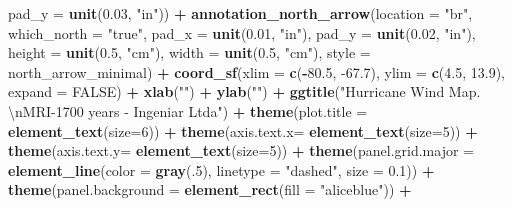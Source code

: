 \documentclass[12pt,oneside]{reedthesis}
\newenvironment{Shaded}{\begin{snugshade}}{\end{snugshade}}
\newcommand{\CharTok}[1]{\textcolor[rgb]{0.31,0.60,0.02}{#1}}
\newcommand{\DataTypeTok}[1]{\textcolor[rgb]{0.13,0.29,0.53}{#1}}
\newcommand{\DecValTok}[1]{\textcolor[rgb]{0.00,0.00,0.81}{#1}}
\newcommand{\FloatTok}[1]{\textcolor[rgb]{0.00,0.00,0.81}{#1}}
\newcommand{\KeywordTok}[1]{\textcolor[rgb]{0.13,0.29,0.53}{\textbf{#1}}}
\newcommand{\NormalTok}[1]{#1}
\newcommand{\OperatorTok}[1]{\textcolor[rgb]{0.81,0.36,0.00}{\textbf{#1}}}
\newcommand{\OtherTok}[1]{\textcolor[rgb]{0.56,0.35,0.01}{#1}}
\newcommand{\StringTok}[1]{\textcolor[rgb]{0.31,0.60,0.02}{#1}}
\begin{document}
\begin{Shaded}
\begin{Highlighting}[]
   \DataTypeTok{pad_y =} \KeywordTok{unit}\NormalTok{(}\FloatTok{0.03}\NormalTok{, }\StringTok{"in"}\NormalTok{)) }\OperatorTok{+}\StringTok{ }
\StringTok{  }\KeywordTok{annotation_north_arrow}\NormalTok{(}\DataTypeTok{location =} \StringTok{"br"}\NormalTok{, }\DataTypeTok{which_north =} \StringTok{"true"}\NormalTok{, }\DataTypeTok{pad_x =} \KeywordTok{unit}\NormalTok{(}\FloatTok{0.01}\NormalTok{, }\StringTok{"in"}\NormalTok{), }\DataTypeTok{pad_y =} \KeywordTok{unit}\NormalTok{(}\FloatTok{0.02}\NormalTok{, }\StringTok{"in"}\NormalTok{), }\DataTypeTok{height =} \KeywordTok{unit}\NormalTok{(}\FloatTok{0.5}\NormalTok{, }\StringTok{"cm"}\NormalTok{), }
   \DataTypeTok{width =} \KeywordTok{unit}\NormalTok{(}\FloatTok{0.5}\NormalTok{, }\StringTok{"cm"}\NormalTok{), }\DataTypeTok{style =}\NormalTok{ north_arrow_minimal) }\OperatorTok{+}
\StringTok{  }\KeywordTok{coord_sf}\NormalTok{(}\DataTypeTok{xlim =} \KeywordTok{c}\NormalTok{(}\OperatorTok{-}\FloatTok{80.5}\NormalTok{, }\FloatTok{-67.7}\NormalTok{), }\DataTypeTok{ylim =} \KeywordTok{c}\NormalTok{(}\FloatTok{4.5}\NormalTok{, }\FloatTok{13.9}\NormalTok{), }\DataTypeTok{expand =} \OtherTok{FALSE}\NormalTok{) }\OperatorTok{+}
\StringTok{  }\KeywordTok{xlab}\NormalTok{(}\StringTok{""}\NormalTok{) }\OperatorTok{+}\StringTok{ }
\StringTok{  }\KeywordTok{ylab}\NormalTok{(}\StringTok{""}\NormalTok{) }\OperatorTok{+}\StringTok{ }
\StringTok{  }\KeywordTok{ggtitle}\NormalTok{(}\StringTok{"Hurricane Wind Map. }\CharTok{\textbackslash{}n}\StringTok{MRI-1700 years - Ingeniar Ltda"}\NormalTok{) }\OperatorTok{+}\StringTok{ }
\StringTok{  }\KeywordTok{theme}\NormalTok{(}\DataTypeTok{plot.title =} \KeywordTok{element_text}\NormalTok{(}\DataTypeTok{size=}\DecValTok{6}\NormalTok{)) }\OperatorTok{+}
\StringTok{  }\KeywordTok{theme}\NormalTok{(}\DataTypeTok{axis.text.x=} \KeywordTok{element_text}\NormalTok{(}\DataTypeTok{size=}\DecValTok{5}\NormalTok{)) }\OperatorTok{+}\StringTok{ }
\StringTok{  }\KeywordTok{theme}\NormalTok{(}\DataTypeTok{axis.text.y=} \KeywordTok{element_text}\NormalTok{(}\DataTypeTok{size=}\DecValTok{5}\NormalTok{)) }\OperatorTok{+}
\StringTok{  }\KeywordTok{theme}\NormalTok{(}\DataTypeTok{panel.grid.major =} \KeywordTok{element_line}\NormalTok{(}\DataTypeTok{color =} \KeywordTok{gray}\NormalTok{(.}\DecValTok{5}\NormalTok{), }\DataTypeTok{linetype =} \StringTok{"dashed"}\NormalTok{, }\DataTypeTok{size =} \FloatTok{0.1}\NormalTok{)) }\OperatorTok{+}
\StringTok{  }\KeywordTok{theme}\NormalTok{(}\DataTypeTok{panel.background =} \KeywordTok{element_rect}\NormalTok{(}\DataTypeTok{fill =} \StringTok{"aliceblue"}\NormalTok{)) }\OperatorTok{+}

\end{Highlighting}
\end{Shaded}
\end{document}
